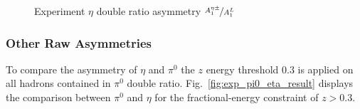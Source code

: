 \begin{figure}[H]
  \caption{Experiment $\eta$ double ratio asymmetry $\nicefrac{A^{\eta\pm}_1}{A^L_1}$}
  \label{fig:exp_eta_result}
\end{figure}

\subsubsection{\texorpdfstring{Other Raw Asymmetries}{Other Raw asymmetries}}
To compare the asymmetry of $\eta$ and $\pi^0$ the $z$ energy threshold $0.3$ is applied on all hadrons contained in $\pi^0$ double ratio. Fig.~\ref{fig:exp_pi0_eta_result} displays  the comparison between $\pi^0$ and $\eta$ for the fractional-energy constraint of $z>0.3$. 

\begin{figure}[H]
  \centering     

\end{figure}
